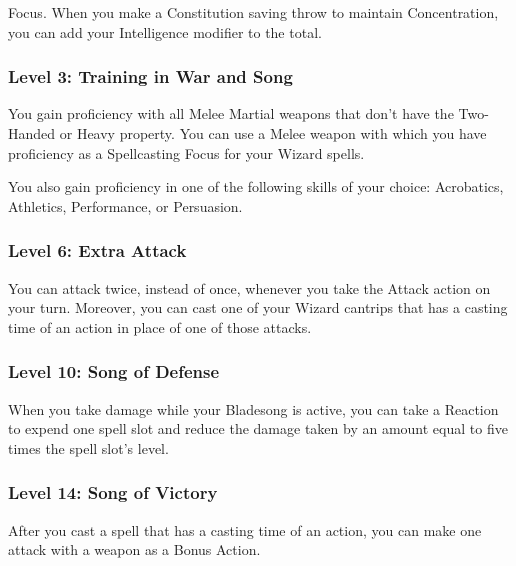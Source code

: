 \documentclass{article}
\begin{document}
Focus. When you make a Constitution saving throw to maintain Concentration, you can add your Intelligence modifier to the total.

\vspace{1em}

\subsubsection*{ Level 3: Training in War and Song }

You gain proficiency with all Melee Martial weapons that don’t have the Two-Handed or Heavy property. You can use a Melee weapon with which you have proficiency as a Spellcasting Focus for your Wizard spells.

You also gain proficiency in one of the following skills of your choice: Acrobatics, Athletics, Performance, or Persuasion.

\vspace{1em}

\subsubsection*{ Level 6: Extra Attack }

You can attack twice, instead of once, whenever you take the Attack action on your turn. Moreover, you can cast one of your Wizard cantrips that has a casting time of an action in place of one of those attacks.

\vspace{1em}

\subsubsection*{ Level 10: Song of Defense }

When you take damage while your Bladesong is active, you can take a Reaction to expend one spell slot and reduce the damage taken by an amount equal to five times the spell slot’s level.

\vspace{1em}

\subsubsection*{ Level 14: Song of Victory }

After you cast a spell that has a casting time of an action, you can make one attack with a weapon as a Bonus Action.

\vspace{1em}
\end{document}
